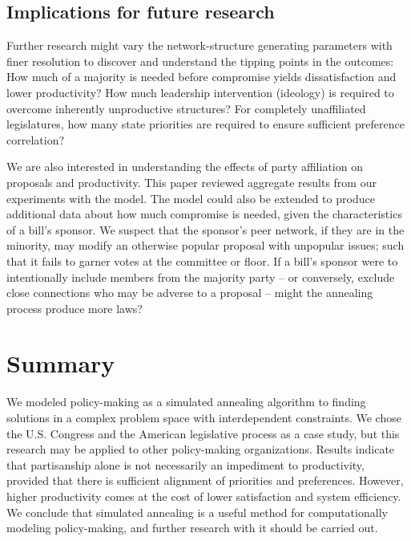 \documentclass[pdftex,12pt]{llncs}
\begin{document}
\subsection{Implications for future research}
Further research might vary the network-structure generating parameters with finer resolution to discover and understand the tipping points in the outcomes:
How much of a majority is needed before compromise yields dissatisfaction and lower productivity? 
How much leadership intervention (ideology) is required to overcome inherently unproductive structures?  
For completely unaffiliated legislatures, how many state priorities are required to ensure sufficient preference correlation?

We are also interested in understanding the effects of party affiliation on proposals and productivity. This paper reviewed aggregate results from our experiments with the model.
The model could also be extended to produce additional data about how much compromise is needed, given the characteristics of a bill's sponsor.
We suspect that the sponsor's peer network, if they are in the minority, may modify an otherwise popular proposal with unpopular issues; such that it fails to garner votes at the committee or floor. 
If a bill's sponsor were to intentionally include members from the majority party -- or conversely, exclude close connections who may be adverse to a proposal -- might the annealing process produce more laws?

\section{Summary}
We modeled policy-making as a simulated annealing algorithm to finding solutions in a complex problem space with interdependent constraints.
We chose the U.S. Congress and the American legislative process as a case study, but this research may be applied to other policy-making organizations.
Results indicate that partisanship alone is not necessarily an impediment to productivity, provided that there is sufficient alignment of priorities and preferences.
However, higher productivity comes at the cost of lower satisfaction and system efficiency.
We conclude that simulated annealing is a useful method for computationally modeling policy-making, and further research with it should be carried out.
 
\end{document}
